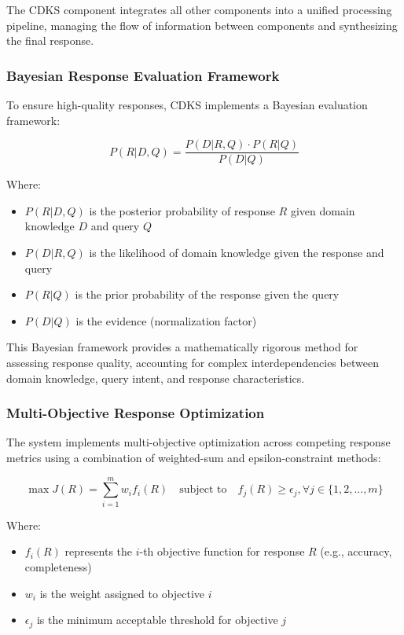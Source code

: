 \documentclass[journal,onecolumn]{IEEEtran}
\begin{document}
The CDKS component integrates all other components into a unified processing pipeline, managing the flow of information between components and synthesizing the final response.

\subsubsection{Bayesian Response Evaluation Framework}

To ensure high-quality responses, CDKS implements a Bayesian evaluation framework:

\begin{equation}
P(R|D,Q) = \frac{P(D|R,Q) \cdot P(R|Q)}{P(D|Q)}
\end{equation}

Where:
\begin{itemize}
\item $P(R|D,Q)$ is the posterior probability of response $R$ given domain knowledge $D$ and query $Q$
\item $P(D|R,Q)$ is the likelihood of domain knowledge given the response and query
\item $P(R|Q)$ is the prior probability of the response given the query
\item $P(D|Q)$ is the evidence (normalization factor)
\end{itemize}

This Bayesian framework provides a mathematically rigorous method for assessing response quality, accounting for complex interdependencies between domain knowledge, query intent, and response characteristics.

\subsubsection{Multi-Objective Response Optimization}

The system implements multi-objective optimization across competing response metrics using a combination of weighted-sum and epsilon-constraint methods:

\begin{equation}
\max J(R) = \sum_{i=1}^{m} w_i f_i(R) \quad \text{subject to} \quad f_j(R) \geq \epsilon_j, \forall j \in \{1,2,...,m\}
\end{equation}

Where:
\begin{itemize}
\item $f_i(R)$ represents the $i$-th objective function for response $R$ (e.g., accuracy, completeness)
\item $w_i$ is the weight assigned to objective $i$
\item $\epsilon_j$ is the minimum acceptable threshold for objective $j$
\end{itemize}
\end{document}
